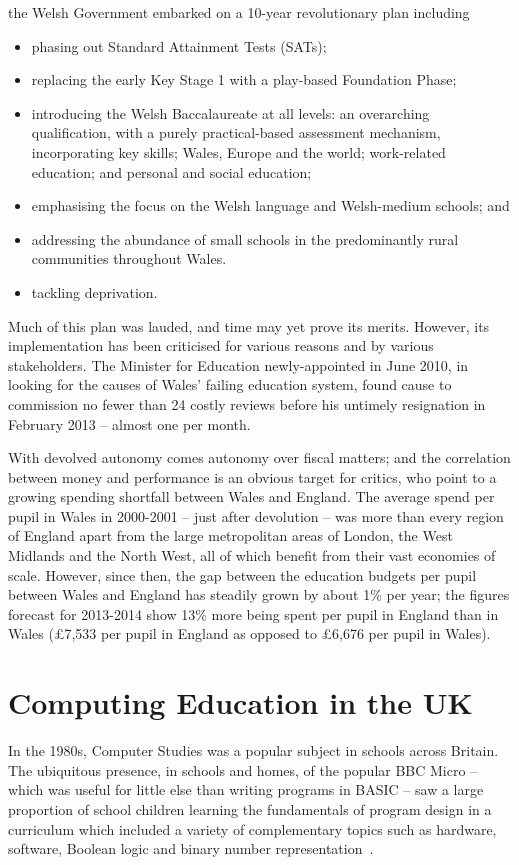 \documentclass{sig-alternate}
\begin{document}
the Welsh Government embarked on a 10-year revolutionary plan
including
\begin{itemize}
\item
phasing out Standard Attainment Tests (SATs);
\item
replacing the early Key Stage 1 with
a play-based Foundation Phase;
\item
introducing the Welsh Baccalaureate at all levels:
an overarching qualification,
with a purely practical-based assessment mechanism,
incorporating
key skills; Wales, Europe and the world;
work-related education; and personal and social education;
\item
emphasising the focus on the Welsh language and  Welsh-medium schools;
and
\item
addressing the abundance of small schools in the 
predominantly rural communities throughout Wales.
\item
tackling deprivation.
\end{itemize}
Much of this plan was lauded, and time may yet prove its merits.
However, its implementation has been criticised
for various reasons and by various stakeholders.
The Minister for Education newly-appointed in June 2010,
in looking for the causes of Wales' failing education system,
found cause to commission
no fewer than 24 costly reviews
before his untimely resignation in February 2013 -- almost one per month.

With devolved autonomy comes autonomy over fiscal matters;
and the correlation between money and performance is
an obvious target for critics, who point to a growing spending shortfall 
between Wales and England.
The average spend per pupil in Wales in 2000-2001
-- just after devolution --
was more than every region of England apart from
the large metropolitan areas of London, the West Midlands and the North West,
all of which benefit from their vast economies of scale.
However, since then, the gap between
the education budgets per pupil between Wales and England
has steadily grown by about 1\% per year;
the figures forecast for 2013-2014 show
13\% more being spent per pupil in England than in Wales
(\pounds7,533 per pupil in England as opposed to
\pounds6,676 per pupil in Wales).

\section{Computing Education in the UK}

In the 1980s, Computer Studies was a popular subject
in schools across Britain. The ubiquitous presence, in schools and homes,
of the popular BBC Micro -- which was useful for little else than
writing programs in BASIC -- saw a large proportion
of school children learning the fundamentals of program design
in a curriculum which included a variety of complementary
topics such as hardware, software, Boolean logic
and binary number representation~\cite{Doyle:1988}.
\end{document}
